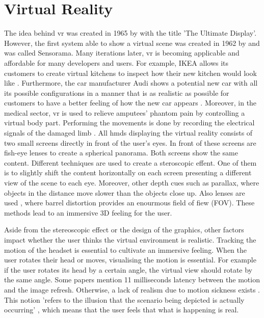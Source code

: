 \section{Virtual Reality}\label{section:background_virtualreality}
The idea behind \gls{vr} was created in 1965 by \citeauthor{Sutherland195} with the title 'The Ultimate Display'. However, the first system able to show a virtual scene was created in 1962 by \citeauthor{Heilig1962} and was called Sensorama. Many iterations later, \gls{vr} is becoming applicable and affordable for many developers and users. For example, IKEA allows its customers to create virtual kitchens to inspect how their new kitchen would look like \parencite{Ikea2020}. Furthermore, the car manufacturer Audi shows a potential new car with all its possible configurations in a manner that is as realistic as possible for customers to have a better feeling of how the new car appears \parencite{Audi2017}. Moreover, in the medical sector, \gls{vr} is used to relieve amputees' phantom pain by controlling a virtual body part. Performing the movements is done by recording the electrical signals of the damaged limb \parencite{Murray2007}. All \glspl{hmd} displaying the virtual reality consists of two small screens directly in front of the user's eyes. In front of these screens are fish-eye lenses to create a spherical panorama. Both screens show the same content. Different techniques are used to create a steroscopic effent. One of them is to slightly shift the content horizontally on each screen presenting a different view of the scene to each eye. Moreover, other depth cues such as parallax, where objects in the distance move slower than the objects close up. Also lenses are used , where barrel distortion provides an enourmous field of fiew (FOV). These methods lead to an immersive 3D feeling for the user. 
\par
Aside from the stereoscopic effect or the design of the graphics, other factors impact whether the user thinks the virtual environment is realistic. Tracking the motion of the headset is essential to cultivate an immersive feeling. When the user rotates their head or moves, visualising the motion is essential. For example if the user rotates its head by a certain angle, the virtual view should rotate by the same angle. Some papers mention 11 milliseconds latency between the motion and the image refresh. Otherwise, a lack of realism due to motion sickness exists \parencite{Kim2018}. This notion 'refers to the illusion that the scenario being depicted is actually occurring' \parencite{Slater2009}, which means that the user feels that what is happening is real.


